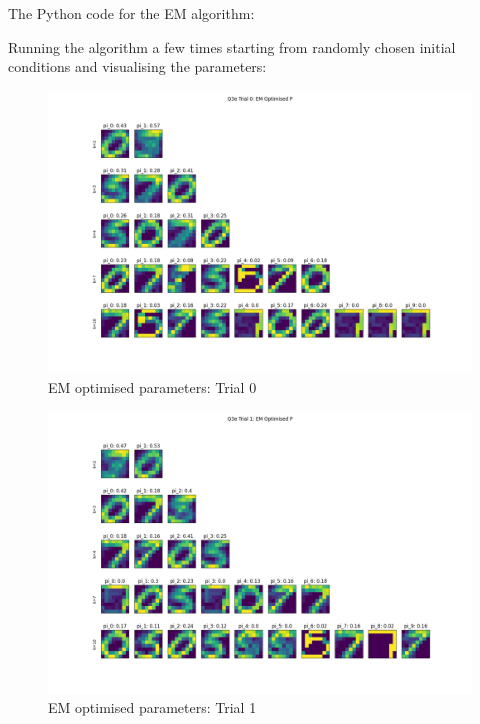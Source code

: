 \documentclass[12pt]{article}
\begin{document}
\begin{enumerate}
{\newpage
The Python code for the EM algorithm:

\newpage
\item[(e)] Running the algorithm a few times starting from randomly chosen initial conditions and visualising the parameters:

\begin{figure}[h]
  \centering
  \includegraphics[scale=0.3]{outputs/q3/q3e-0-optimised-p}
  \caption{EM optimised parameters: Trial 0}
  \label{fig:3e-initialised-p-trial-0}
\end{figure}
\begin{figure}[h]
  \centering
  \includegraphics[scale=0.3]{outputs/q3/q3e-1-optimised-p}
  \caption{EM optimised parameters: Trial 1}
  \label{fig:3e-initialised-p-trial-1}
\end{figure}
\newpage

}
\end{enumerate}
\end{document}
